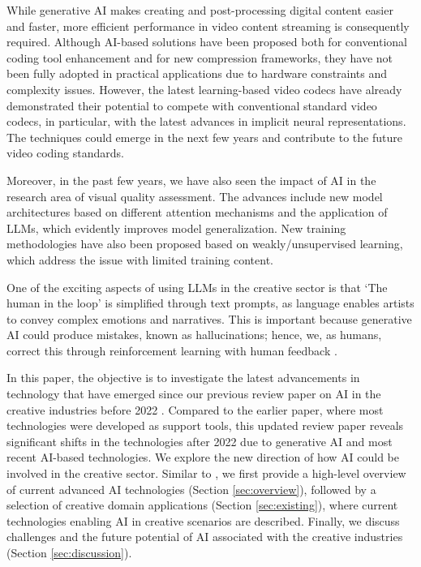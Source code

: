 \documentclass[11pt,a4paper]{article}
\begin{document}
While generative AI makes creating and post-processing digital content easier and faster, more efficient performance in video content streaming is consequently required. Although AI-based solutions have been proposed both for conventional coding tool enhancement and for new compression frameworks, they have not been fully adopted in practical applications due to hardware constraints and complexity issues. However, the latest learning-based video codecs have already demonstrated their potential to compete with conventional standard video codecs, in particular, with the latest advances in implicit neural representations. The techniques could emerge in the next few years and contribute to the future video coding standards.

Moreover, in the past few years, we have also seen the impact of AI in the research area of visual quality assessment. The advances include new model architectures based on different attention mechanisms and the application of LLMs, which evidently improves model generalization. New training methodologies have also been proposed based on weakly/unsupervised learning, which address the issue with limited training content.


One of the exciting aspects of using LLMs in the creative sector is that `The human in the loop' \cite{chung:human-loop:2021} is simplified through text prompts, as language enables artists to convey complex emotions and narratives. This is important because generative AI could produce mistakes, known as hallucinations; hence, we, as humans, correct this through reinforcement learning with human feedback \cite{Wu:brief:2023}.



In this paper, the objective is to investigate the latest advancements in technology that have emerged since our previous review paper on AI in the creative industries before 2022 \cite{Anantrasirichai:AI:2022}. Compared to the earlier paper, where most technologies were developed as support tools, this updated review paper reveals significant shifts in the technologies after 2022 due to generative AI and most recent AI-based technologies. We explore the new direction of how AI could be involved in the creative sector. Similar to \cite{Anantrasirichai:AI:2022}, we first provide a high-level overview of current advanced AI technologies (Section \ref{sec:overview}), followed by a selection of creative domain applications (Section \ref{sec:existing}), where current technologies enabling AI in creative scenarios are described. Finally, we discuss challenges and the future potential of AI associated with the creative industries (Section \ref{sec:discussion}).
\end{document}
